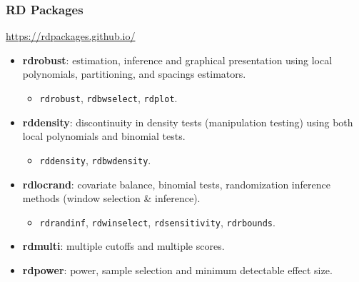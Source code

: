 \documentclass[9pt]{beamer}
\begin{document}
\begin{frame}\frametitle{RD Packages}
	\smallskip
	\begin{center}
		\url{https://rdpackages.github.io/}\medskip
	\end{center}
	
	\begin{itemize}
		\item \textbf{rdrobust}: estimation, inference and graphical presentation using local polynomials, partitioning, and spacings estimators.\medskip
		\begin{itemize}
			\item \texttt{rdrobust}, \texttt{rdbwselect}, \texttt{rdplot}.\bigskip
		\end{itemize}
		
		\item \textbf{rddensity}: discontinuity in density tests (manipulation testing) using both local polynomials and binomial tests.\medskip
		\begin{itemize}
			\item \texttt{rddensity}, \texttt{rdbwdensity}.\bigskip
		\end{itemize}
	
		\item \textbf{rdlocrand}: covariate balance, binomial tests, randomization inference methods (window selection \& inference).\medskip		
		\begin{itemize}
			\item \texttt{rdrandinf}, \texttt{rdwinselect}, \texttt{rdsensitivity}, \texttt{rdrbounds}.\bigskip
		\end{itemize}
		
		\item \textbf{rdmulti}: multiple cutoffs and multiple scores.\bigskip
		
		\item \textbf{rdpower}: power, sample selection and minimum detectable effect size.
		
	\end{itemize}
\end{frame}
\end{document}
